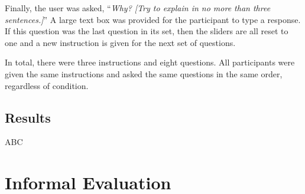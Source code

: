 Finally, the user was asked, ``\textit{Why? [Try to explain in no more than three sentences.]}''  A large text box was provided for the participant to type a response.  If this question was the last question in its set, then the sliders are all reset to one and a new instruction is given for the next set of questions. 

In total, there were three instructions and eight questions.  All participants were given the same instructions and asked the same questions in the same order, regardless of condition.

\subsection{Results}

ABC

\section{Informal Evaluation}
